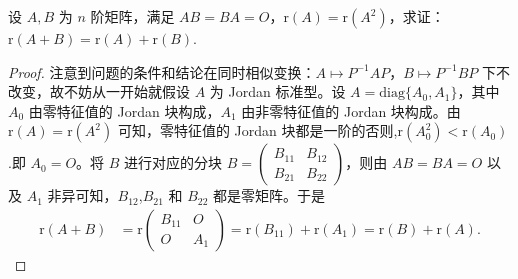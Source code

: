 \documentclass[../../main.tex]{subfiles}
\begin{document}
\begin{proposition}\label{proposition:r(A+B)=r(A)+r(B)}
设 $A,B$ 为 $n$ 阶矩阵，满足 $AB = BA = O$，$\mathrm{r}(A) = \mathrm{r}(A^2)$，求证：$\mathrm{r}(A + B) = \mathrm{r}(A) + \mathrm{r}(B)$.
\end{proposition}
\begin{proof}
注意到问题的条件和结论在同时相似变换：$A\mapsto P^{-1}AP$，$B\mapsto P^{-1}BP$ 下不改变，故不妨从一开始就假设 $A$ 为 Jordan 标准型。设 $A = \mathrm{diag}\{A_0,A_1\}$，其中 $A_0$ 由零特征值的 Jordan 块构成，$A_1$ 由非零特征值的 Jordan 块构成。由 $\mathrm{r}(A) = \mathrm{r}(A^2)$ 可知，零特征值的 Jordan 块都是一阶的否则,$\mathrm{r}(A^2_0)<\mathrm{r}(A_0)$.即 $A_0 = O$。将 $B$ 进行对应的分块 $B = \begin{pmatrix}B_{11}&B_{12}\\B_{21}&B_{22}\end{pmatrix}$，则由 $AB = BA = O$ 以及 $A_1$ 非异可知，$B_{12}$,$B_{21}$ 和 $B_{22}$ 都是零矩阵。于是
\begin{align*}
\mathrm{r}(A + B) &= \mathrm{r}\begin{pmatrix}B_{11}&O\\O&A_1\end{pmatrix} = \mathrm{r}(B_{11}) + \mathrm{r}(A_1) = \mathrm{r}(B) + \mathrm{r}(A).
\end{align*}

\end{proof}
\end{document}
